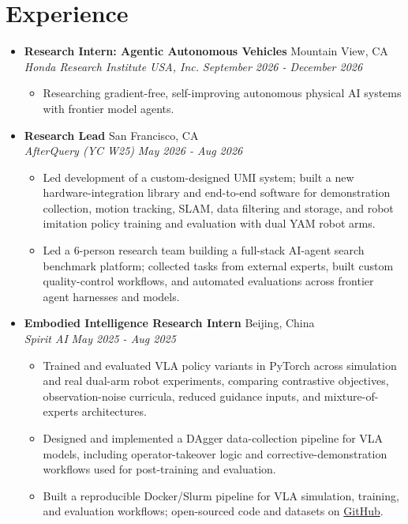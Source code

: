 \documentclass[letterpaper,11pt]{article}
\newcommand{\linkhref}[2]{\textcolor{linkblue}{\href{#1}{#2}}}
\newcommand{\Date}[1]{\textit{\small #1}}
\newcommand{\headingjob}[4]{
  \textbf{#1} \hfill #2 \\
  \textit{#3} \hfill \Date{#4}
}
\begin{document}
\section{Experience}
\begin{itemize}[label={}, leftmargin=0pt]
    \item \headingjob{Research Intern: Agentic Autonomous Vehicles}{Mountain View, CA}{Honda Research Institute USA, Inc.}{September 2026 - December 2026}
          \begin{itemize}
              \item Researching gradient-free, self-improving autonomous physical AI systems with frontier model agents.
          \end{itemize}
    \item \headingjob{Research Lead}{San Francisco, CA}{AfterQuery (YC W25)}{May 2026 - Aug 2026}
          \begin{itemize}
              \item Led development of a custom-designed UMI system; built a new hardware-integration library and end-to-end software for demonstration collection, motion tracking, SLAM, data filtering and storage, and robot imitation policy training and evaluation with dual YAM robot arms.
              \item Led a 6-person research team building a full-stack AI-agent search benchmark platform; collected tasks from external experts, built custom quality-control workflows, and automated evaluations across frontier agent harnesses and models.
          \end{itemize}
    \item \headingjob{Embodied Intelligence Research Intern}{Beijing, China}{Spirit AI}{May 2025 - Aug 2025}
          \begin{itemize}
              \item Trained and evaluated VLA policy variants in PyTorch across simulation and real dual-arm robot experiments, comparing contrastive objectives, observation-noise curricula, reduced guidance inputs, and mixture-of-experts architectures.
              \item Designed and implemented a DAgger data-collection pipeline for VLA models, including operator-takeover logic and corrective-demonstration workflows used for post-training and evaluation.
              \item Built a reproducible Docker/Slurm pipeline for VLA simulation, training, and evaluation workflows; open-sourced code and datasets on \linkhref{https://github.com/Robot-VLA/lerobot-vla.git}{GitHub}.
          \end{itemize}
\end{itemize}
\end{document}
